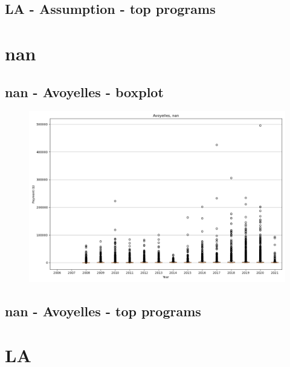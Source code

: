 \subsection*{LA - Assumption - top programs}

\newpage
\section*{nan}
\subsection*{nan - Avoyelles - boxplot}
\begin{figure}[h]
\centering
\includegraphics[width=7in]{../output/boxplots/counties/Avoyelles-nan_boxplot.png}
\end{figure}


\subsection*{nan - Avoyelles - top programs}

\newpage
\section*{LA}
